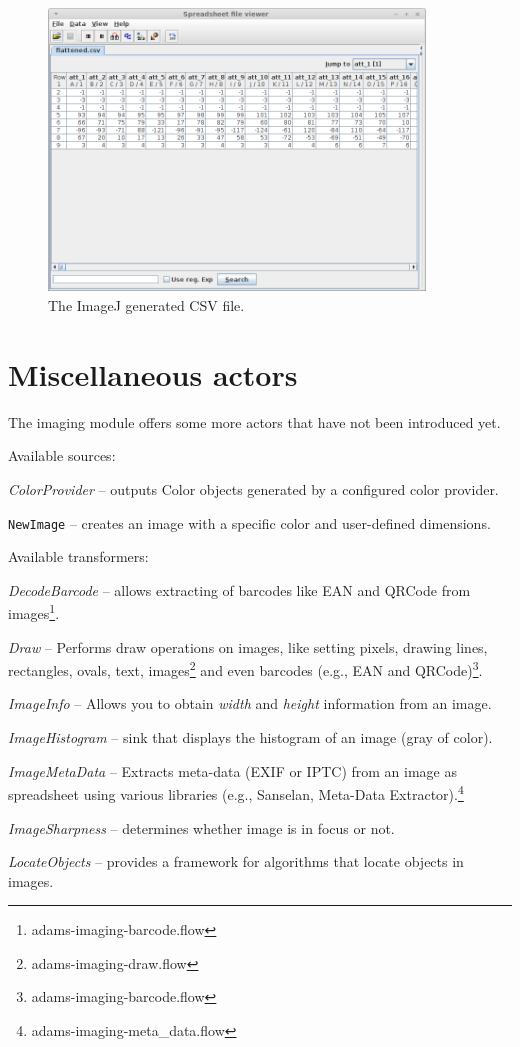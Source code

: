 \documentclass[a4paper]{book}
\begin{document}
\begin{figure}[htb]
  \centering
  \includegraphics[width=10.0cm]{images/imagej-csv-generation-dataset.png}
  \caption{The ImageJ generated CSV file.}
  \label{imagej-csv-generation-dataset}
\end{figure}


\chapter{Miscellaneous actors}
The imaging module offers some more actors that have not been introduced yet.

\noindent Available sources:
\begin{tight_itemize}
	\item \textit{ColorProvider} -- outputs Color objects generated by a 
	configured color provider.
    \item \texttt{NewImage} -- creates an image with a specific color and
    user-defined dimensions.
\end{tight_itemize}

\noindent Available transformers:
\begin{tight_itemize}
	\item \textit{DecodeBarcode} -- allows extracting of barcodes like
	EAN and QRCode from images\footnote{adams-imaging-barcode.flow}.
	\item \textit{Draw} -- Performs draw operations on images, like setting
	pixels, drawing lines, rectangles, ovals, text, images\footnote{adams-imaging-draw.flow}
	and even barcodes (e.g., EAN and QRCode)\footnote{adams-imaging-barcode.flow}.
	\item \textit{ImageInfo} -- Allows you to obtain \textit{width} and
	\textit{height} information from an image.
	\item \textit{ImageHistogram} -- sink that displays the histogram of an image
	(gray of color).
	\item \textit{ImageMetaData} -- Extracts meta-data (EXIF or IPTC) from an
	image as spreadsheet using various libraries (e.g., Sanselan\cite{sanselan}, 
	Meta-Data Extractor\cite{metadataextractor}).\footnote{adams-imaging-meta\_data.flow}
	\item \textit{ImageSharpness} -- determines whether image is in focus or not.
	\item \textit{LocateObjects} -- provides a framework for algorithms that
	locate objects in images.
\end{tight_itemize}
\end{document}
